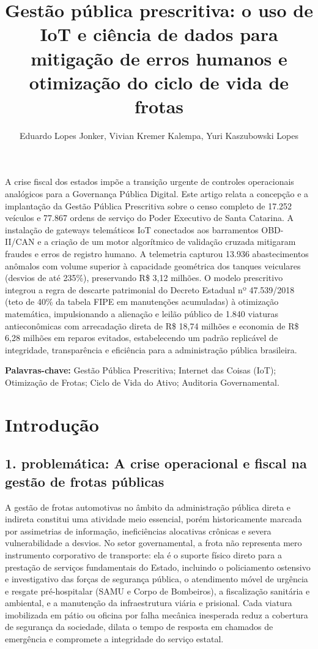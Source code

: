 \documentclass[12pt,a4paper]{article}
\title{\textbf{Gestão pública prescritiva: o uso de IoT e ciência de dados para mitigação de erros humanos e otimização do ciclo de vida de frotas}}
\author{Eduardo Lopes Jonker\inst{1}, Vivian Kremer Kalempa\inst{1}, Yuri Kaszubowski Lopes\inst{1}}
\begin{document}
\maketitle

\begin{resumo}
A crise fiscal dos estados impõe a transição urgente de controles operacionais analógicos para a Governança Pública Digital. Este artigo relata a concepção e a implantação da Gestão Pública Prescritiva sobre o censo completo de 17.252 veículos e 77.867 ordens de serviço do Poder Executivo de Santa Catarina. A instalação de gateways telemáticos IoT conectados aos barramentos OBD-II/CAN e a criação de um motor algorítmico de validação cruzada mitigaram fraudes e erros de registro humano. A telemetria capturou 13.936 abastecimentos anômalos com volume superior à capacidade geométrica dos tanques veiculares (desvios de até 235\%), preservando R\$ 3,12 milhões. O modelo prescritivo integrou a regra de descarte patrimonial do Decreto Estadual nº 47.539/2018 (teto de 40\% da tabela FIPE em manutenções acumuladas) à otimização matemática, impulsionando a alienação e leilão público de 1.840 viaturas antieconômicas com arrecadação direta de R\$ 18,74 milhões e economia de R\$ 6,28 milhões em reparos evitados, estabelecendo um padrão replicável de integridade, transparência e eficiência para a administração pública brasileira.

\vspace{0.2cm}
\noindent\textbf{Palavras-chave:} Gestão Pública Prescritiva; Internet das Coisas (IoT); Otimização de Frotas; Ciclo de Vida do Ativo; Auditoria Governamental.
\end{resumo}



\section{Introdução}


\subsection{1. problemática: A crise operacional e fiscal na gestão de frotas públicas}

A gestão de frotas automotivas no âmbito da administração pública direta e indireta constitui uma atividade meio essencial, porém historicamente marcada por assimetrias de informação, ineficiências alocativas crônicas e severa vulnerabilidade a desvios. No setor governamental, a frota não representa mero instrumento corporativo de transporte: ela é o suporte físico direto para a prestação de serviços fundamentais do Estado, incluindo o policiamento ostensivo e investigativo das forças de segurança pública, o atendimento móvel de urgência e resgate pré-hospitalar (SAMU e Corpo de Bombeiros), a fiscalização sanitária e ambiental, e a manutenção da infraestrutura viária e prisional. Cada viatura imobilizada em pátio ou oficina por falha mecânica inesperada reduz a cobertura de segurança da sociedade, dilata o tempo de resposta em chamados de emergência e compromete a integridade do serviço estatal.
\end{document}
